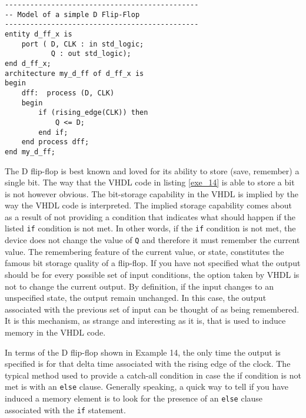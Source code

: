 \begin{lstlisting}[label=exe_14, caption=Solution to Example 14.]
----------------------------------------------
-- Model of a simple D Flip-Flop
----------------------------------------------
entity d_ff_x is 
	port ( D, CLK : in std_logic; 
		   Q : out std_logic); 
end d_ff_x; 
architecture my_d_ff of d_ff_x is 
begin
	dff:  process (D, CLK)
	begin
		if (rising_edge(CLK)) then
			Q <= D; 
		end if; 
	end process dff; 
end my_d_ff; 
\end{lstlisting}

The D flip-flop is best known and loved for its ability to store (save, remember) a single bit. The way that the VHDL code in listing \ref{exe_14} is able to store a bit is not however obvious. The bit-storage capability in the VHDL is implied by the way the VHDL code is interpreted. The implied storage capability comes about as a result of not providing a condition that indicates what should happen if the listed \texttt{if} condition is not met. In other words, if the \texttt{if} condition is not met, the device does not change the value of \texttt{Q} and therefore it must remember the current value. The remembering feature of the current value, or state, constitutes the famous bit storage quality of a flip-flop. If you have not specified what the output should be for every possible set of input conditions, the option taken by VHDL is not to change the current output. By definition, if the input changes to an unspecified state, the output remain unchanged. In this case, the output associated with the previous set of input can be thought of as being remembered. It is this mechanism, as strange and interesting as it is, that is used to induce memory in the VHDL code. 

In terms of the D flip-flop shown in Example 14, the only time the output is specified is for that delta time associated with the rising edge of the clock. The typical method used to provide a catch-all condition in case the if condition is not met is with an \texttt{else} clause. Generally speaking, a quick way to tell if you have induced a memory element is to look for the presence of an \texttt{else} clause associated with the \texttt{if} statement. 

